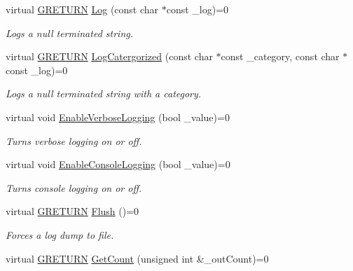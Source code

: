 \begin{DoxyCompactItemize}
\item 
virtual \hyperlink{namespace_g_w_a69b1aaebac1cac8049825f035884c95b}{G\+R\+E\+T\+U\+RN} \hyperlink{class_g_w_1_1_c_o_r_e_1_1_g_log_a9b9ec52b1b35eb2fd9a63ec7312fd31a}{Log} (const char $\ast$const \+\_\+log)=0
\begin{DoxyCompactList}\small\item\em Logs a null terminated string. \end{DoxyCompactList}\item 
virtual \hyperlink{namespace_g_w_a69b1aaebac1cac8049825f035884c95b}{G\+R\+E\+T\+U\+RN} \hyperlink{class_g_w_1_1_c_o_r_e_1_1_g_log_ab7dbe43179c1de11c9ddac9d6cba01cf}{Log\+Catergorized} (const char $\ast$const \+\_\+category, const char $\ast$const \+\_\+log)=0
\begin{DoxyCompactList}\small\item\em Logs a null terminated string with a category. \end{DoxyCompactList}\item 
virtual void \hyperlink{class_g_w_1_1_c_o_r_e_1_1_g_log_ac14e65291dba9480deadd772a8f0e307}{Enable\+Verbose\+Logging} (bool \+\_\+value)=0
\begin{DoxyCompactList}\small\item\em Turns verbose logging on or off. \end{DoxyCompactList}\item 
virtual void \hyperlink{class_g_w_1_1_c_o_r_e_1_1_g_log_a9a486a646a0a02bb5724100c1849fcec}{Enable\+Console\+Logging} (bool \+\_\+value)=0
\begin{DoxyCompactList}\small\item\em Turns console logging on or off. \end{DoxyCompactList}\item 
virtual \hyperlink{namespace_g_w_a69b1aaebac1cac8049825f035884c95b}{G\+R\+E\+T\+U\+RN} \hyperlink{class_g_w_1_1_c_o_r_e_1_1_g_log_a1e0bb42d95ddd42fa019d5cd6050ff97}{Flush} ()=0
\begin{DoxyCompactList}\small\item\em Forces a log dump to file. \end{DoxyCompactList}\item 
\hypertarget{class_g_w_1_1_c_o_r_e_1_1_g_interface_a80f212dcdf60202cf9da49405863d1d5}{}\label{class_g_w_1_1_c_o_r_e_1_1_g_interface_a80f212dcdf60202cf9da49405863d1d5} 
virtual \hyperlink{namespace_g_w_a69b1aaebac1cac8049825f035884c95b}{G\+R\+E\+T\+U\+RN} \hyperlink{class_g_w_1_1_c_o_r_e_1_1_g_interface_a80f212dcdf60202cf9da49405863d1d5}{Get\+Count} (unsigned int \&\+\_\+out\+Count)=0

\end{DoxyCompactItemize}
